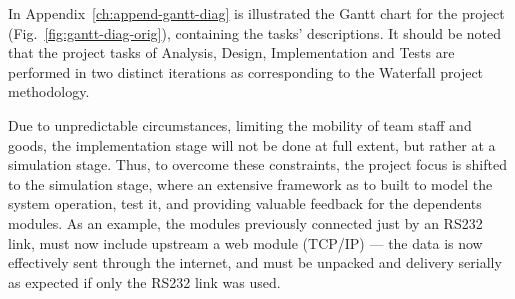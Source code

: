 In Appendix~\ref{ch:append-gantt-diag} is illustrated the Gantt chart for the
project (Fig.~\ref{fig:gantt-diag-orig}), containing the tasks' descriptions. It should be noted
that the project tasks of Analysis, Design, Implementation and Tests are
performed in two distinct iterations as corresponding to the Waterfall project
methodology.

Due to unpredictable circumstances, limiting the mobility of team
staff and goods, the implementation stage will not be done at full extent, but
rather at a simulation stage. Thus, to overcome these constraints, the project
focus is shifted to the simulation stage, where an extensive framework as to
built to model the system operation, test it, and providing valuable feedback
for the dependents modules. As an example, the modules previously connected just
by an RS232 link, must now include upstream a web module (TCP/IP) --- the data
is now effectively sent through the internet, and must be unpacked and delivery
serially as expected if only the RS232 link was used.

